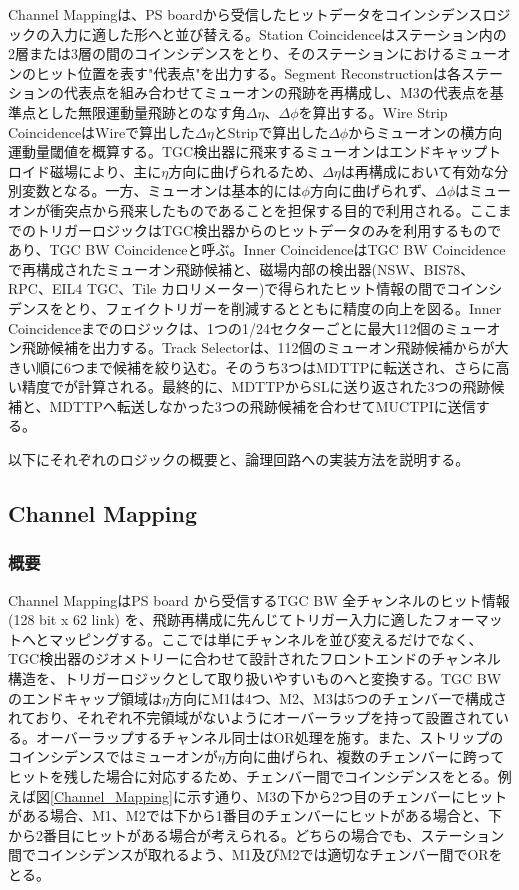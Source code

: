 Channel Mappingは、PS boardから受信したヒットデータをコインシデンスロジックの入力に適した形へと並び替える。Station Coincidenceはステーション内の2層または3層の間のコインシデンスをとり、そのステーションにおけるミューオンのヒット位置を表す"代表点"を出力する。Segment Reconstructionは各ステーションの代表点を組み合わせてミューオンの飛跡を再構成し、M3の代表点を基準点とした無限運動量飛跡とのなす角$\Delta\eta$、$\Delta\phi$を算出する。Wire Strip CoincidenceはWireで算出した$\Delta\eta$とStripで算出した$\Delta\phi$からミューオンの横方向運動量閾値\pt を概算する。TGC検出器に飛来するミューオンはエンドキャップトロイド磁場により、主に$\eta$方向に曲げられるため、$\Delta\eta$は\pt 再構成において有効な分別変数となる。一方、ミューオンは基本的には$\phi$方向に曲げられず、$\Delta\phi$はミューオンが衝突点から飛来したものであることを担保する目的で利用される。ここまでのトリガーロジックはTGC検出器からのヒットデータのみを利用するものであり、TGC BW Coincidenceと呼ぶ。Inner CoincidenceはTGC BW Coincidenceで再構成されたミューオン飛跡候補と、磁場内部の検出器(NSW、BIS78、RPC、EIL4 TGC、Tile カロリメーター)で得られたヒット情報の間でコインシデンスをとり、フェイクトリガーを削減するとともに\pt 精度の向上を図る。Inner Coincidenceまでのロジックは、1つの1/24セクターごとに最大112個のミューオン飛跡候補を出力する。Track Selectorは、112個のミューオン飛跡候補から\pt が大きい順に6つまで候補を絞り込む。そのうち3つはMDTTPに転送され、さらに高い精度で\pt が計算される。最終的に、MDTTPからSLに送り返された3つの飛跡候補と、MDTTPへ転送しなかった3つの飛跡候補を合わせてMUCTPIに送信する。


以下にそれぞれのロジックの概要と、論理回路への実装方法を説明する。

\subsection{Channel Mapping}
\subsubsection*{概要}
Channel MappingはPS board から受信するTGC BW 全チャンネルのヒット情報 (128 bit x 62 link) を、飛跡再構成に先んじてトリガー入力に適したフォーマットへとマッピングする。ここでは単にチャンネルを並び変えるだけでなく、TGC検出器のジオメトリーに合わせて設計されたフロントエンドのチャンネル構造を、トリガーロジックとして取り扱いやすいものへと変換する。TGC BW のエンドキャップ領域は$\eta$方向にM1は4つ、M2、M3は5つのチェンバーで構成されており、それぞれ不完領域がないようにオーバーラップを持って設置されている。オーバーラップするチャンネル同士はOR処理を施す。また、ストリップのコインシデンスではミューオンが$\eta$方向に曲げられ、複数のチェンバーに跨ってヒットを残した場合に対応するため、チェンバー間でコインシデンスをとる。例えば図\ref{Channel_Mapping}に示す通り、M3の下から2つ目のチェンバーにヒットがある場合、M1、M2では下から1番目のチェンバーにヒットがある場合と、下から2番目にヒットがある場合が考えられる。どちらの場合でも、ステーション間でコインシデンスが取れるよう、M1及びM2では適切なチェンバー間でORをとる。

